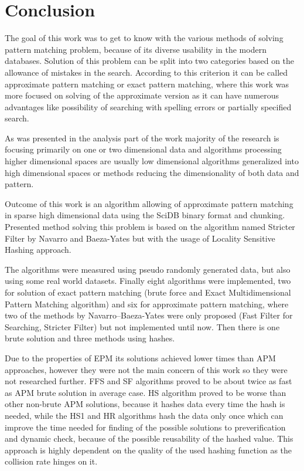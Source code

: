 \chapter{Conclusion}
The goal of this work was to get to know with the various methods of solving pattern matching problem, because of its diverse usability in the modern databases. Solution of this problem can be split into two categories based on the allowance of mistakes in the search. According to this criterion it can be called approximate pattern matching or exact pattern matching, where this work was more focused on solving of the approximate version as it can have numerous advantages like possibility of searching with spelling errors or partially specified search. 

As was presented in the analysis part of the work majority of the research is focusing primarily on one or two dimensional data and algorithms processing higher dimensional spaces are usually low dimensional algorithms generalized into high dimensional spaces or methods reducing the dimensionality of both data and pattern. 

Outcome of this work is an algorithm allowing of approximate pattern matching in sparse high dimensional data using the SciDB binary format and chunking. Presented method solving this problem is based on the algorithm named Stricter Filter by Navarro and Baeza-Yates but with the usage of Locality Sensitive Hashing approach. 

The algorithms were measured using pseudo randomly generated data, but also using some real world datasets. Finally eight algorithms were implemented, two for solution of exact pattern matching (brute force and Exact Multidimensional Pattern Matching algorithm) and six for approximate pattern matching, where two of the methods by Navarro--Baeza-Yates were only proposed (Fast Filter for Searching, Stricter Filter) but not implemented until now. Then there is one brute solution and three methods using hashes.

Due to the properties of EPM its solutions achieved lower times than APM approaches, however they were not the main concern of this work so they were not researched further.
FFS and SF algorithms proved to be about twice as fast as APM brute solution in average case.
HS algorithm proved to be worse than other non-brute APM solutions, because it hashes data every time the hash is needed, while the HS1 and HR algorithms hash the data only once which can improve the time needed for finding of the possible solutions to preverification and dynamic check, because of the possible reusability of the hashed value. This approach is highly dependent on the quality of the used hashing function as the collision rate hinges on it.


